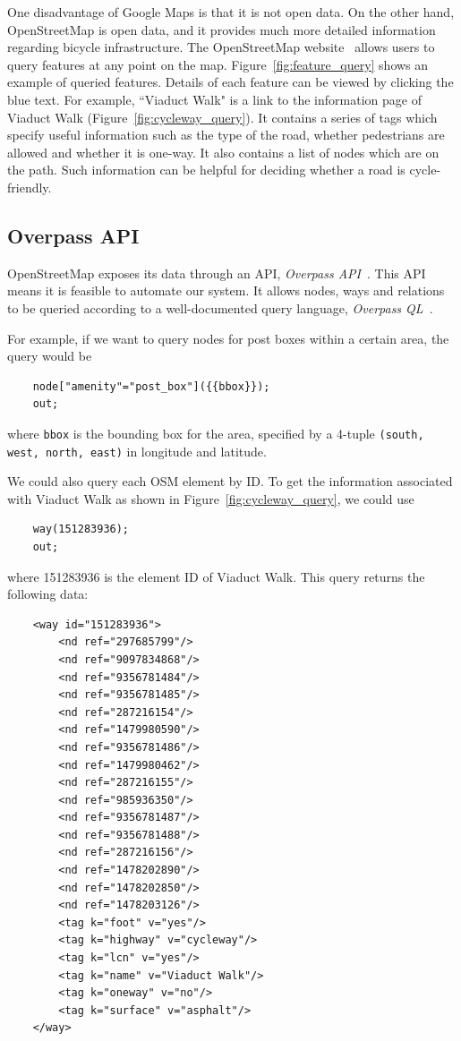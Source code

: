 \documentclass[12pt,a4paper]{report}
\begin{document}
One disadvantage of Google Maps is that it is not open data. On the other hand, OpenStreetMap is open data, and it provides much more detailed information regarding bicycle infrastructure. The OpenStreetMap website~\cite{OpenStreetMap} allows users to query features at any point on the map. Figure~\ref{fig:feature_query} shows an example of queried features. Details of each feature can be viewed by clicking the blue text. For example, ``Viaduct Walk" is a link to the information page of Viaduct Walk (Figure~\ref{fig:cycleway_query}). It contains a series of tags which specify useful information such as the type of the road, whether pedestrians are allowed and whether it is one-way. It also contains a list of nodes which are on the path. Such information can be helpful for deciding whether a road is cycle-friendly.

\subsection{Overpass API}
OpenStreetMap exposes its data through an API, \textit{Overpass API}~\cite{wiki:overpass}. This API means it is feasible to automate our system. It allows nodes, ways and relations to be queried according to a well-documented query language, \textit{Overpass QL}~\cite{wiki:overpassql}. 

For example, if we want to query nodes for post boxes within a certain area, the query would be
\begin{verbatim}
    node["amenity"="post_box"]({{bbox}});
    out;
\end{verbatim}
where \texttt{bbox} is the bounding box for the area, specified by a 4-tuple \texttt{(south, west, north, east)} in longitude and latitude.

We could also query each OSM element by ID. To get the information associated with Viaduct Walk as shown in Figure~\ref{fig:cycleway_query}, we could use
\begin{verbatim}
    way(151283936);
    out;
\end{verbatim}
where 151283936 is the element ID of Viaduct Walk. This query returns the following data:
\begin{verbatim}
    <way id="151283936">
        <nd ref="297685799"/>
        <nd ref="9097834868"/>
        <nd ref="9356781484"/>
        <nd ref="9356781485"/>
        <nd ref="287216154"/>
        <nd ref="1479980590"/>
        <nd ref="9356781486"/>
        <nd ref="1479980462"/>
        <nd ref="287216155"/>
        <nd ref="985936350"/>
        <nd ref="9356781487"/>
        <nd ref="9356781488"/>
        <nd ref="287216156"/>
        <nd ref="1478202890"/>
        <nd ref="1478202850"/>
        <nd ref="1478203126"/>
        <tag k="foot" v="yes"/>
        <tag k="highway" v="cycleway"/>
        <tag k="lcn" v="yes"/>
        <tag k="name" v="Viaduct Walk"/>
        <tag k="oneway" v="no"/>
        <tag k="surface" v="asphalt"/>
    </way>
\end{verbatim}
\end{document}
